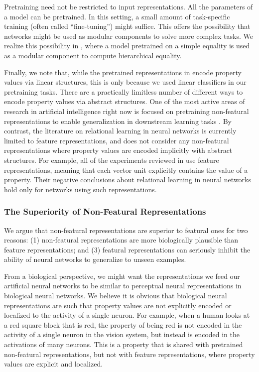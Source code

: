 \documentclass[9pt,twocolumn,twoside,lineno]{pnas-new}
\begin{document}
{Pretraining need not be restricted to input representations. All the parameters of a model can be pretrained. In this setting, a small amount of task-specific training (often called ``fine-tuning'') might suffice. This offers the possibility that networks might be used as modular components to solve more complex tasks. We realize this possibility in , where a model pretrained on a simple equality is used as a modular component to compute hierarchical equality.

Finally, we note that, while the pretrained representations in  encode property values via linear structures, this is only because we used linear classifiers in our pretraining tasks. There are a practically limitless number of different ways to encode property values via abstract structures. One of the most active areas of research in artificial intelligence right now is focused on pretraining non-featural representations to enable generalization in downstream learning tasks \cite{CollobertWeston:2011,Mikolov-etal:2013,pennington-socher-manning:2014:EMNLP2014,Peters-etal:2018,Devlin-etal:2019}. By contrast, the literature on relational learning in neural networks is currently limited to feature representations, and does not consider any non-featural representations where property values are encoded implicitly with abstract structures. For example, all of the experiments reviewed in \cite{alhama:2019} use feature representations, meaning that each vector unit explicitly contains the value of a property. Their negative conclusions about relational learning in neural networks hold only for networks using such representations.


\subsubsection*{The Superiority of Non-Featural Representations}

We argue that non-featural representations are superior to featural ones for two reasons: (1) non-featural representations are more biologically plausible than feature representations; and (3) featural representations can seriously inhibit the ability of neural networks to generalize to unseen examples.

From a biological perspective, we might want the representations we feed our artificial neural networks to be similar to perceptual neural representations in biological neural networks. We believe it is obvious that biological neural representations are such that property values are not explicitly encoded or localized to the activity of a single neuron. For example, when a human looks at a red square block that is red, the property of being red is not encoded in the activity of a single neuron in the vision system, but instead is encoded in the activations of many neurons. This is a property that is shared with pretrained non-featural representations, but not with feature representations, where property values are explicit and localized.

}
\end{document}
